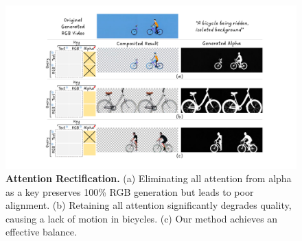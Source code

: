 \begin{figure}[t]
    \centering
    \includegraphics[width=1.0\linewidth]{figs/method-attn.pdf}
    \vspace{-0.2in}
    \caption{\textbf{Attention Rectification.} (a) Eliminating all attention from alpha as a key preserves 100\% RGB generation but leads to poor alignment. (b) Retaining all attention significantly degrades quality, causing a lack of motion in bicycles. (c) Our method achieves an effective balance.
    }
    \label{fig-attn}
    \vspace{-0.1in}
\end{figure}



